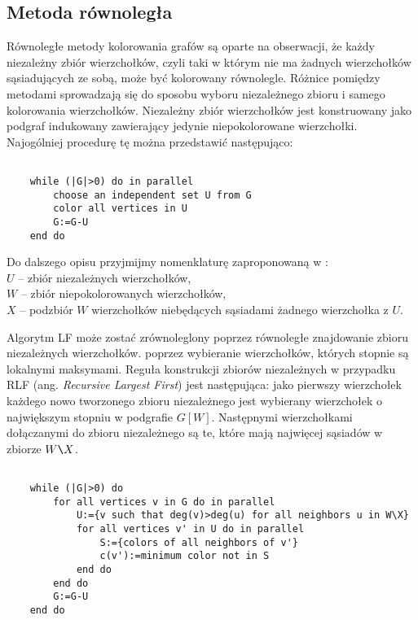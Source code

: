 \documentclass{article}
\begin{document}
	\subsection{Metoda równoległa}
	Równoległe metody kolorowania grafów są oparte na obserwacji, że każdy niezależny zbiór wierzchołków, czyli taki w którym nie ma żadnych wierzchołków sąsiadujących ze sobą, może być kolorowany równolegle. Różnice pomiędzy metodami sprowadzają się do sposobu wyboru niezależnego zbioru i samego kolorowania wierzchołków. Niezależny zbiór wierzchołków jest konstruowany jako podgraf indukowany zawierający jedynie niepokolorowane wierzchołki. Najogólniej procedurę tę można przedstawić następująco:
	\begin{lstlisting}
	
	while (|G|>0) do in parallel
		choose an independent set U from G
		color all vertices in U
		G:=G-U
	end do
	\end{lstlisting}
	
	Do dalszego opisu przyjmijmy nomenklaturę zaproponowaną w \cite{gis}:\\
	$U$ -- zbiór niezależnych wierzchołków,\\
	$W$ -- zbiór niepokolorowanych wierzchołków,\\
	$X$ -- podzbiór $W$ wierzchołków niebędących sąsiadami żadnego wierzchołka z $U$.
	
	Algorytm LF może zostać zrównoleglony poprzez równoległe znajdowanie zbioru niezależnych wierzchołków. poprzez wybieranie wierzchołków, których stopnie są lokalnymi maksymami.
	Reguła konstrukcji zbiorów niezależnych w przypadku RLF (ang. \textit{Recursive Largest First}) jest następująca: jako pierwszy wierzchołek każdego nowo tworzonego zbioru niezależnego jest wybierany wierzchołek o największym stopniu w podgrafie $G[W]$. Następnymi wierzchołkami dołączanymi do zbioru niezależnego są te, które mają najwięcej sąsiadów w zbiorze $W\verb|\|X$.
	\begin{lstlisting}
	
	while (|G|>0) do
		for all vertices v in G do in parallel
			U:={v such that deg(v)>deg(u) for all neighbors u in W\X}
			for all vertices v' in U do in parallel
				S:={colors of all neighbors of v'}
				c(v'):=minimum color not in S
			end do
		end do
		G:=G-U
	end do
	\end{lstlisting}
\end{document}
